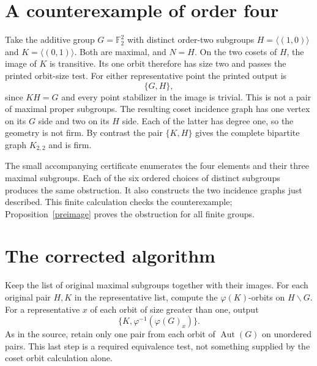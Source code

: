\documentclass[10pt,a4paper]{article}
\newcommand{\Aut}{\operatorname{Aut}}
\begin{document}
\section{A counterexample of order four}
Take the additive group $G=\mathbb F_2^2$ with distinct order-two
subgroups $H=\langle(1,0)\rangle$ and
$K=\langle(0,1)\rangle$. Both are maximal, and $N=H$. On the two
cosets of $H$, the image of $K$ is transitive. Its one orbit therefore
has size two and passes the printed orbit-size test. For either
representative point the printed output is
\[
                   \{G,H\},
\]
since $KH=G$ and every point stabilizer in the image is trivial.
This is not a pair of maximal proper subgroups. The resulting coset
incidence graph has one vertex on its $G$ side and two on its $H$
side. Each of the latter has degree one, so the geometry is not firm.
By contrast the pair $\{K,H\}$ gives the complete bipartite graph
$K_{2,2}$ and is firm.

The small accompanying certificate enumerates the four elements and
their three maximal subgroups. Each of the six ordered choices of
distinct subgroups produces the same obstruction. It also constructs
the two incidence graphs just described. This finite calculation
checks the counterexample; Proposition~\ref{preimage} proves the
obstruction for all finite groups.

\section{The corrected algorithm}
Keep the list of original maximal subgroups together with their images.
For each original pair $H,K$ in the representative list, compute the
$\varphi(K)$-orbits on $H\backslash G$. For a representative $x$
of each orbit of size greater than one, output
\[
             \{K,\varphi^{-1}(\varphi(G)_x)\}.
 \tag{2}
\]
As in the source, retain only one pair from each orbit of $\Aut(G)$
on unordered pairs. This last step is a required equivalence test,
not something supplied by the coset orbit calculation alone.
\end{document}
